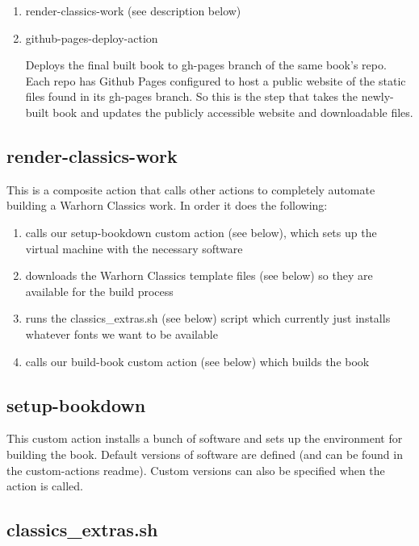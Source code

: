 \documentclass[
]{book}
\providecommand{\tightlist}{%
  \setlength{\itemsep}{0pt}\setlength{\parskip}{0pt}}
\begin{document}
\begin{enumerate}
\def\labelenumi{\arabic{enumi}.}
\item
  render-classics-work
  (see description below)
\item
  github-pages-deploy-action

  Deploys the final built book to gh-pages branch of the same book's repo. Each repo has Github Pages configured to host a public website of the static files found in its gh-pages branch. So this is the step that takes the newly-built book and updates the publicly accessible website and downloadable files.
\end{enumerate}

\hypertarget{render-classics-work}{%
\subsection{render-classics-work}\label{render-classics-work}}

This is a composite action that calls other actions to completely automate building a Warhorn Classics work. In order it does the following:

\begin{enumerate}
\def\labelenumi{\arabic{enumi}.}
\tightlist
\item
  calls our setup-bookdown custom action (see below), which sets up the virtual machine with the necessary software
\item
  downloads the Warhorn Classics template files (see below) so they are available for the build process
\item
  runs the classics\_extras.sh (see below) script which currently just installs whatever fonts we want to be available
\item
  calls our build-book custom action (see below) which builds the book
\end{enumerate}

\hypertarget{setup-bookdown}{%
\subsection{setup-bookdown}\label{setup-bookdown}}

This custom action installs a bunch of software and sets up the environment for building the book. Default versions of software are defined (and can be found in the custom-actions readme). Custom versions can also be specified when the action is called.

\hypertarget{classics_extras.sh}{%
\subsection{classics\_extras.sh}\label{classics_extras.sh}}
\end{document}
